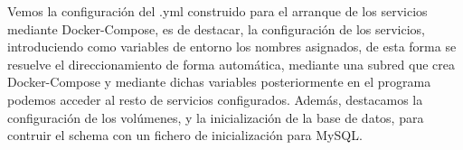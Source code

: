 Vemos la configuración del .yml construido para el arranque de los servicios mediante Docker-Compose, es de destacar, la configuración de los servicios, introduciendo como variables de entorno los nombres asignados, de esta forma se resuelve el direccionamiento de forma automática, mediante una subred que crea Docker-Compose y mediante dichas variables posteriormente en el programa podemos acceder al resto de servicios configurados. Además, destacamos la configuración de los volúmenes, y la inicialización de la base de datos, para contruir el schema con un fichero de inicialización para MySQL.

